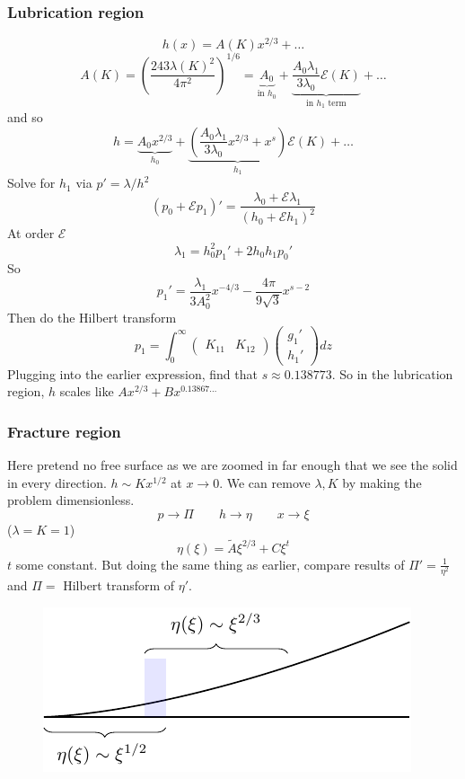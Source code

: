 \documentclass{article}
\newcommand{\cE}{\mathcal{E}}                               %
\begin{document}
\subsubsection*{Lubrication region}
\[h(x) = A(K)x^{2/3} + \dots\]
\[A(K) = \left(\frac{243\lambda(K)^2}{4\pi^2}\right)^{1/6}
=\underbrace{A_0}_{\mbox{in } h_0} + 
\underbrace{\frac{A_0\lambda_1}{3\lambda_0}\cE(K)}_{\mbox{in } 
h_1 \mbox{ term}} + \dots\]
and so
\[ h = \underbrace{A_0 x^{2/3}}_{h_0} + 
\underbrace{\left( \frac{A_0\lambda_1}{3\lambda_0} x^{2/3} +x^s\right)  }_{h_1} 
\cE(K) + \dots \]
Solve for $h_1$ via $p' = \lambda/h^2$
\[ (p_0 + \cE p_1)' = \frac{\lambda_0 + \cE\lambda_1}{(h_0+\cE h_1)^2} \]
At order $\cE$
\[\lambda_1 = h_0^2 p_1' + 2h_0h_1p_0'\]
So
\[p_1' = \frac{\lambda_1}{3A_0^2}x^{-4/3} - \frac{4\pi}{9\sqrt{3}}x^{s-2}\]
Then do the Hilbert transform
\[ p_1 =
 \int_0^{\infty} \left(
\begin{array}{cc} K_{11} & K_{12} \end{array}
\right)
 \left( \begin{array}{c} g_1' \\ h_1' \end{array} \right) dz
\]
Plugging into the earlier expression, find that $s\approx 0.138773$.
So in the lubrication region, $h$ scales like $Ax^{2/3}+Bx^{0.13867\dots}$

\subsubsection*{Fracture region}
Here pretend no free surface as we are zoomed in far enough that we see
the solid in every direction.
$h\sim Kx^{1/2}$ at $x\to0$. We can remove $\lambda, K$ by making the problem
dimensionless.
\[ p \to \Pi \qquad h \to \eta \qquad x \to \xi \]
($\lambda = K = 1$)
\[ \eta(\xi) = \tilde{A}\xi^{2/3} + C \xi^{t}\]
$t$ some constant. But doing the same thing as earlier, compare results
of $\Pi'=\frac{1}{\eta^2}$ and $\Pi=$ Hilbert transform of $\eta'$.
\begin{figure}[!ht]\centering
\includegraphics{Fig7.pdf}
\end{figure}
\end{document}
